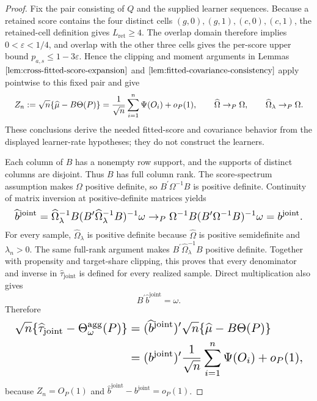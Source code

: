 \documentclass{article}
\begin{document}
\begin{proof}
Fix the pair consisting of \(Q\) and the supplied learner sequences. Because a retained score contains the four distinct cells \((g,0),(g,1),(c,0),(c,1)\), the retained-cell definition gives \(L_{\mathrm{ret}}\ge4\). The overlap domain therefore implies \(0<\varepsilon<1/4\), and overlap with the other three cells gives the per-score upper bound \(p_{a,s}\le1-3\varepsilon\). Hence the clipping and moment arguments in Lemmas \(\ref{lem:cross-fitted-score-expansion}\) and \(\ref{lem:fitted-covariance-consistency}\) apply pointwise to this fixed pair and give
\[
\makebox[\linewidth][c]{\resizebox{0.98\linewidth}{!}{\(\displaystyle Z_n:=\sqrt n\{\widehat\mu-B\Theta(P)\}
=\frac1{\sqrt n}\sum_{i=1}^n\Psi(O_i)+o_P(1),
\qquad
\widehat\Omega\to_P\Omega,
\qquad
\widehat\Omega_\lambda\to_P\Omega.\)}}
\]
These conclusions derive the needed fitted-score and covariance behavior from the displayed learner-rate hypotheses; they do not construct the learners.

Each column of \(B\) has a nonempty row support, and the supports of distinct columns are disjoint. Thus \(B\) has full column rank. The score-spectrum assumption makes \(\Omega\) positive definite, so \(B^{\prime}\Omega^{-1}B\) is positive definite. Continuity of matrix inversion at positive-definite matrices yields
\[
\makebox[\linewidth][c]{\resizebox{0.98\linewidth}{!}{\(\displaystyle \widehat b^{\mathrm{joint}}
=\widehat\Omega_\lambda^{-1}B
 (B^{\prime}\widehat\Omega_\lambda^{-1}B)^{-1}\omega
\to_P
\Omega^{-1}B(B^{\prime}\Omega^{-1}B)^{-1}\omega
=b^{\mathrm{joint}}.\)}}
\]
For every sample, \(\widehat\Omega_\lambda\) is positive definite because \(\widehat\Omega\) is positive semidefinite and \(\lambda_n>0\). The same full-rank argument makes \(B^{\prime}\widehat\Omega_\lambda^{-1}B\) positive definite. Together with propensity and target-share clipping, this proves that every denominator and inverse in \(\widehat\tau_{\mathrm{joint}}\) is defined for every realized sample. Direct multiplication also gives
\[
B^{\prime}\widehat b^{\mathrm{joint}}=\omega.
\]
Therefore
\[
\makebox[\linewidth][c]{\resizebox{0.98\linewidth}{!}{\(\displaystyle \begin{aligned}
\sqrt n\{\widehat\tau_{\mathrm{joint}}-\Theta_\omega^{\mathrm{agg}}(P)\}
&=(\widehat b^{\mathrm{joint}})^{\prime}
  \sqrt n\{\widehat\mu-B\Theta(P)\}\\
&=(b^{\mathrm{joint}})^{\prime}\frac1{\sqrt n}
  \sum_{i=1}^n\Psi(O_i)+o_P(1),
\end{aligned}\)}}
\]
because \(Z_n=O_P(1)\) and \(\widehat b^{\mathrm{joint}}-b^{\mathrm{joint}}=o_P(1)\).


\end{proof}
\end{document}
